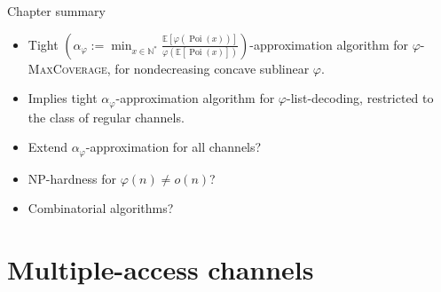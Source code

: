 \documentclass{beamer}
\theoremstyle{definition}
\theoremstyle{remark}
\DeclareMathOperator{\Poi}{\text{Poi}}
\begin{document}
\begin{frame}{Chapter summary}
  \begin{itemize}
  \item Tight $\left(\alpha_{\varphi}:= \min_{x \in \mathbb{N^*}} \frac{\mathbb{E}[\varphi(\Poi(x))]}{\varphi(\mathbb{E}[\Poi(x)])}\right)$-approximation algorithm for $\varphi$-\textsc{MaxCoverage}, for nondecreasing concave sublinear $\varphi$.
    \pause
  \item Implies tight $\alpha_{\varphi}$-approximation algorithm for $\varphi$-list-decoding, restricted to the class of regular channels.
    \pause
    \bigskip
  \item Extend $\alpha_{\varphi}$-approximation for all channels?
  \item \textrm{NP}-hardness for $\varphi(n)\not=o(n)$?
  \item Combinatorial algorithms?
  \end{itemize}
\end{frame}

\section{Multiple-access channels}
\end{document}
